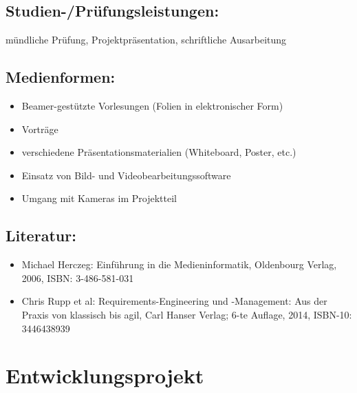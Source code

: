 \section*{Studien-/Prüfungsleistungen:}\label{studien-pruxfcfungsleistungen-8}

mündliche Prüfung, Projektpräsentation, schriftliche Ausarbeitung

\section*{Medienformen:}\label{medienformen-5}

\begin{itemize}
\tightlist
\item
  Beamer-gestützte Vorlesungen (Folien in elektronischer Form)
\item
  Vorträge
\item
  verschiedene Präsentationsmaterialien (Whiteboard, Poster, etc.)
\item
  Einsatz von Bild- und Videobearbeitungssoftware
\item
  Umgang mit Kameras im Projektteil
\end{itemize}

\section*{Literatur:}\label{literatur-7}

\begin{itemize}
\tightlist
\item
  Michael Herczeg: Einführung in die Medieninformatik, Oldenbourg
  Verlag, 2006, ISBN: 3-486-581-031
\item
  Chris Rupp et al: Requirements-Engineering und -Management: Aus der
  Praxis von klassisch bis agil, Carl Hanser Verlag; 6-te Auflage, 2014,
  ISBN-10: 3446438939
\end{itemize}

\chapter{Entwicklungsprojekt}\label{entwicklungsprojekt}

